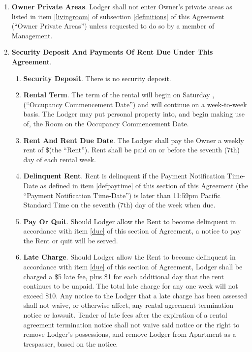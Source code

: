 \documentclass[12pt,letterpaper]{article}
\newcommand{\datefillin}{\hspace{0.2cm}\makebox[.2\linewidth]{\hrulefill}}
\newcommand{\lodger}{Lodger}
\newcommand{\management}{Management}
\newcommand{\apt}{Apartment}
\newcommand{\room}{Room}
\newcommand{\furniture}{Furniture, Kitchenware, Linen, etc.}
\newcommand{\livingroom}{Owner Private Areas}
\newcommand{\firstday}{Occupancy Commencement Date}
\newcommand{\paymenttime}{Payment Notification Time-Date}
\begin{document}
\begin{enumerate}
\begin{enumerate}
			\item \textbf{\furniture{}}. \management{} shall provide the \furniture{} listed in item \ref{furniture} of subsection \ref{definitions} of this Agreement{} (``\furniture{}'') in usable condition and maintain same in usable condition during the time \room{} is rented to \lodger{}.
		\end{enumerate}
	\item \textbf{\livingroom{}}. \lodger{} shall not enter Owner's private areas as listed in item \ref{livingroom} of subsection \ref{definitions} of this Agreement (``\livingroom{}'') unless requested to do so by a member of \management{}.
	\item \textbf{Security Deposit And Payments Of Rent Due Under This Agreement}. 
		\begin{enumerate}
			\item \textbf{Security Deposit}. There is no security deposit. 
			\item \textbf{Rental Term}. The term of the rental will begin on Saturday \datefillin, (``\firstday{}'') and will continue on a week-to-week basis. The \lodger{} may put personal property into, and begin making use of, the \room{} on the \firstday{}.
			\item \textbf{Rent And Rent Due Date}. The \lodger{} shall pay the Owner a weekly rent of \$\datefillin (the ``Rent''). Rent shall be paid on or before the seventh (7th) day of each rental week. 
			\item \textbf{Delinquent Rent}. \label{due}
					Rent is delinquent if the \paymenttime{} as defined in item \ref{defpaytime} of this section of this Agreement (the ``\paymenttime{}'') is later than 11:59pm Pacific Standard Time on the seventh (7th) day of the week when due. 
			\item \textbf{Pay Or Quit}. Should \lodger{} allow the Rent to become delinquent in accordance with item \ref{due} of this section of Agreement, a notice to pay the Rent or quit will be served. 
			\item \textbf{Late Charge}. Should \lodger{} allow the Rent to become delinquent in accordance with item \ref{due} of this section of Agreement, \lodger{} shall be charged a \$5 late fee, plus \$1 for each additional day that the rent continues to be unpaid.  The total late charge for any one week will not exceed \$10. Any notice to the \lodger{} that a late charge has been assessed shall not waive, or otherwise affect, any rental agreement termination notice or lawsuit. Tender of late fees after the expiration of a rental agreement termination notice shall not waive said notice or the right to remove \lodger{}'s possessions, and remove \lodger{} from \apt{} as a trespasser, based on the notice. 

\end{enumerate}
\end{enumerate}
\end{document}
